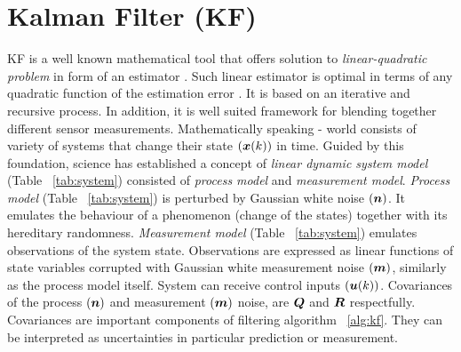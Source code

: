 \section{Kalman Filter (KF)} \label{sec:kf} 
KF \cite{kalman60}  is a well known mathematical tool that offers solution to \textit{linear-quadratic problem} in form of an estimator \cite{grewal01,ristic04}. Such linear estimator is optimal in terms of any quadratic function of the estimation error \cite{grewal01}. It is based on an iterative and recursive process. In addition, it is well suited framework for blending together different sensor measurements. Mathematically speaking - world consists of variety of systems that change their state $(\boldsymbol{x}(k))$ in time. Guided by this foundation, science has established a concept of \textit{linear dynamic system model} (Table ~\ref{tab:system}) consisted of \textit{process model} and \textit{measurement model}. \textit{Process model} (Table ~\ref{tab:system}) is perturbed by Gaussian white noise $(\boldsymbol{n})$. It emulates the behaviour of a phenomenon (change of the states) together with its hereditary randomness. \textit{Measurement model} (Table ~\ref{tab:system}) emulates observations of the system state. Observations are expressed as linear functions of state variables corrupted with Gaussian white measurement noise $(\boldsymbol{m})$, similarly as the process model itself. System can receive control inputs $(\boldsymbol{u}(k))$. Covariances of the process $(\boldsymbol{n})$ and measurement $(\boldsymbol{m})$ noise, are $\boldsymbol{Q}$ and $\boldsymbol{R}$ respectfully. Covariances are important components of filtering algorithm ~\ref{alg:kf}. They can be interpreted as uncertainties in particular prediction or measurement.
